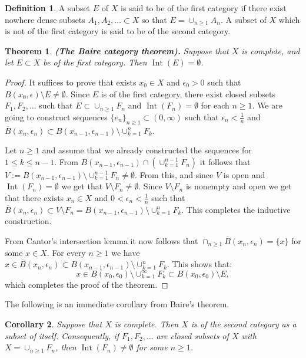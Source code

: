 \documentclass[11pt,a4paper]{article}
\theoremstyle{definition}
\newtheorem{definition}{Definition}[section]
\theoremstyle{plain}
\newtheorem{theorem}{Theorem}[section]
\newtheorem{corollary}[theorem]{Corollary}
\DeclareMathOperator{\Int}{Int}
\renewcommand{\tt}[1]{\textnormal{\textbf{(#1).}}} %
\begin{document}
	\begin{definition}
		A subset $E$ of $X$ is said to be of the first category if there exist
		nowhere dense subsets $A_1,A_2,\dots \subset X$ so that 
		$E = \cup_{n \geq 1}{A_n}$. A subset of $X$ which is not of the first 
		category is said to be of the second category.
	\end{definition}
	\begin{theorem}
		\tt{The Baire category theorem}
		Suppose that $X$ is complete, and let $E \subset X$ be of the first
		category. Then $\Int(E) = \emptyset$.
	\end{theorem}
	\begin{proof}
		It suffices to prove that exists $x_0 \in X$ and $\epsilon_0 > 0$ such
		that $B(x_0,\epsilon) \setminus E \neq \emptyset$. Since $E$ is of
		the first category, there exist closed subsets $F_1,F_2,\dots$ such that
		$E \subset \cup_{n \geq 1}{F_n}$ and $\Int(F_n) = \emptyset$ for each
		$n \geq 1$. We are going to construct sequences 
		$\{e_n\}_{n \geq 1} \subset (0,\infty)$ such that 
		$\epsilon_n < \frac{1}{n}$ and $\overline{B}(x_n,\epsilon_n) \subset
		B(x_{n-1},\epsilon_{n-1}) \setminus \cup_{k=1}^{n}{F_k}$. 
		
		Let $n \geq 1$ and assume that we already constructed the sequences
		for $1 \le k \le n-1$. From 
		$B(x_{n-1},\epsilon_{n-1}) \cap (\cup_{k=1}^{n-1}{F_n})$ it follows that 	
		$V:=B(x_{n-1},\epsilon_{n-1}) \setminus \cup_{k=1}^{n-1}{F_n} 
		\neq \emptyset$. From this, and since $V$ is open and 
		$\Int(F_n) = \emptyset$ we get that $V \setminus F_n \neq \emptyset$.
		Since $V \setminus F_n$ is nonempty and open we get that there exists
		$x_n \in X$ and $0 < \epsilon_n < \frac{1}{n}$ such that
		$\overline{B}(x_n,\epsilon_n) \subset V \setminus F_n = 
		B(x_{n-1},\epsilon_{n-1}) \setminus \cup_{k=1}^{n}{F_k}$.
		This completes the inductive construction.
		
		From Cantor's intersection lemma it now follows that
		$\cap_{n \geq 1}{\overline{B}(x_n,\epsilon_n)} = \{x\}$ for some
		$x \in X$. For every $n \geq 1$ we have 
		$x \in \overline{B}(x_n,\epsilon_n) \subset 
		B(x_{n-1},\epsilon_{n-1}) \setminus \cup_{k=1}^{n}{F_k}$. This
		shows that:
		\[
			x \in B(x_{0},\epsilon_{0}) \setminus \cup_{k=1}^{\infty}{F_k}
			\subset B(x_0,\epsilon_0) \setminus E,
		\]
		which completes the proof of the theorem.
	\end{proof}
	The following is an immediate corollary from Baire's theorem.
	\begin{corollary}
		Suppose that $X$ is complete. Then $X$ is of the second category as a
		subset of itself. Consequently, if $F_1,F_2,\dots$ are closed subsets 
		of $X$ with $X = \cup_{n \geq 1}{F_n}$, then $\Int(F_n) \neq \emptyset$ 
		for some $n \geq 1$.
	\end{corollary}
\end{document}
